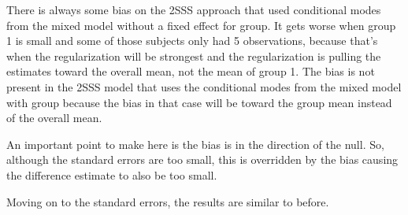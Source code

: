 \documentclass[
]{book}
\newenvironment{Shaded}{\begin{snugshade}}{\end{snugshade}}
\newcommand{\CommentTok}[1]{\textcolor[rgb]{0.56,0.35,0.01}{\textit{#1}}}
\newcommand{\DataTypeTok}[1]{\textcolor[rgb]{0.13,0.29,0.53}{#1}}
\newcommand{\KeywordTok}[1]{\textcolor[rgb]{0.13,0.29,0.53}{\textbf{#1}}}
\newcommand{\NormalTok}[1]{#1}
\newcommand{\OperatorTok}[1]{\textcolor[rgb]{0.81,0.36,0.00}{\textbf{#1}}}
\newcommand{\StringTok}[1]{\textcolor[rgb]{0.31,0.60,0.02}{#1}}
\begin{document}
There is always some bias on the 2SSS approach that used conditional modes from the mixed model without a fixed effect for group. It gets worse when group 1 is small and some of those subjects only had 5 observations, because that's when the regularization will be strongest and the regularization is pulling the estimates toward the overall mean, not the mean of group 1. The bias is not present in the 2SSS model that uses the conditional modes from the mixed model with group because the bias in that case will be toward the group mean instead of the overall mean.

An important point to make here is the bias is in the direction of the null. So, although the standard errors are too small, this is overridden by the bias causing the difference estimate to also be too small.

Moving on to the standard errors, the results are similar to before.

\begin{Shaded}
\end{Shaded}
\end{document}
